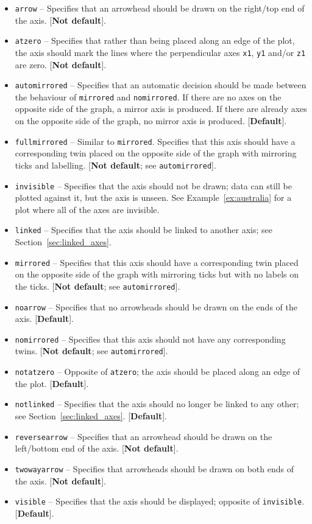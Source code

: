 \begin{itemize}
\item {\tt arrow} -- Specifies that an arrowhead should be drawn on the right/top end of the axis. [{\bf Not default}].
\item {\tt atzero} -- Specifies that rather than being placed along an edge of the plot, the axis should mark the lines where the perpendicular axes {\tt x1}, {\tt y1} and/or {\tt z1} are zero. [{\bf Not default}].
\item {\tt automirrored} -- Specifies that an automatic decision should be made between the behaviour of {\tt mirrored} and {\tt nomirrored}. If there are no axes on the opposite side of the graph, a mirror axis is produced. If there are already axes on the opposite side of the graph, no mirror axis is produced. [{\bf Default}].
\item {\tt fullmirrored} -- Similar to {\tt mirrored}. Specifies that this axis should have a corresponding twin placed on the opposite side of the graph with mirroring ticks and labelling. [{\bf Not default}; see {\tt automirrored}].
\item {\tt invisible} -- Specifies that the axis should not be drawn; data can still be plotted against it, but the axis is unseen. See Example~\ref{ex:australia} for a plot where all of the axes are invisible.
\item {\tt linked} -- Specifies that the axis should be linked to another axis; see Section~\ref{sec:linked_axes}.
\item {\tt mirrored} -- Specifies that this axis should have a corresponding twin placed on the opposite side of the graph with mirroring ticks but with no labels on the ticks. [{\bf Not default}; see {\tt automirrored}].
\item {\tt noarrow} -- Specifies that no arrowheads should be drawn on the ends of the axis. [{\bf Default}].
\item {\tt nomirrored} -- Specifies that this axis should not have any corresponding twins. [{\bf Not default}; see {\tt automirrored}].
\item {\tt notatzero} -- Opposite of {\tt atzero}; the axis should be placed along an edge of the plot. [{\bf Default}].
\item {\tt notlinked} -- Specifies that the axis should no longer be linked to any other; see Section~\ref{sec:linked_axes}. [{\bf Default}].
\item {\tt reversearrow} -- Specifies that an arrowhead should be drawn on the left/bottom end of the axis. [{\bf Not default}].
\item {\tt twowayarrow} -- Specifies that arrowheads should be drawn on both ends of the axis. [{\bf Not default}].
\item {\tt visible} -- Specifies that the axis should be displayed; opposite of {\tt invisible}. [{\bf Default}].
\end{itemize}

